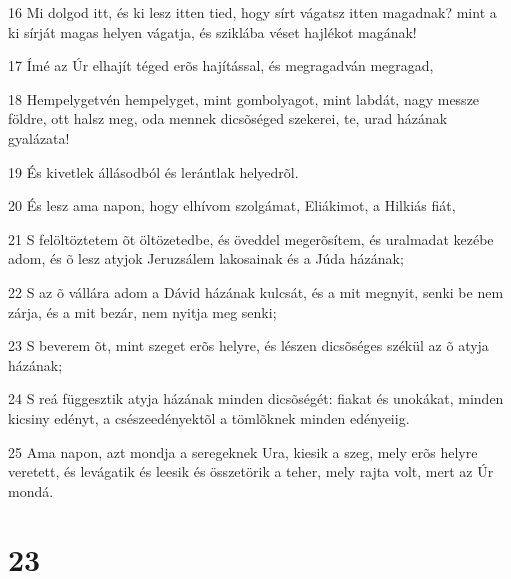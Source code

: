 \par 16 Mi dolgod itt, és ki lesz itten tied, hogy sírt vágatsz itten magadnak? mint a ki sírját magas helyen vágatja, és sziklába véset hajlékot magának!
\par 17 Ímé az Úr elhajít téged erõs hajítással, és megragadván megragad,
\par 18 Hempelygetvén hempelyget, mint gombolyagot, mint labdát, nagy messze földre, ott halsz meg, oda mennek dicsõséged szekerei, te, urad házának gyalázata!
\par 19 És kivetlek állásodból és lerántlak helyedrõl.
\par 20 És lesz ama napon, hogy elhívom szolgámat, Eliákimot, a Hilkiás fiát,
\par 21 S felöltöztetem õt öltözetedbe, és öveddel megerõsítem, és uralmadat kezébe adom, és õ lesz atyjok Jeruzsálem lakosainak és a Júda házának;
\par 22 S az õ vállára adom a Dávid házának kulcsát, és a mit megnyit, senki be nem zárja, és a mit bezár, nem nyitja meg senki;
\par 23 S beverem õt, mint szeget erõs helyre, és lészen dicsõséges székül az õ atyja házának;
\par 24 S reá függesztik atyja házának minden dicsõségét: fiakat és unokákat, minden kicsiny edényt, a csészeedényektõl a tömlõknek minden edényeiig.
\par 25 Ama napon, azt mondja a seregeknek Ura, kiesik a szeg, mely erõs helyre veretett, és levágatik és leesik és összetörik a teher, mely rajta volt, mert az Úr mondá.

\chapter{23}

